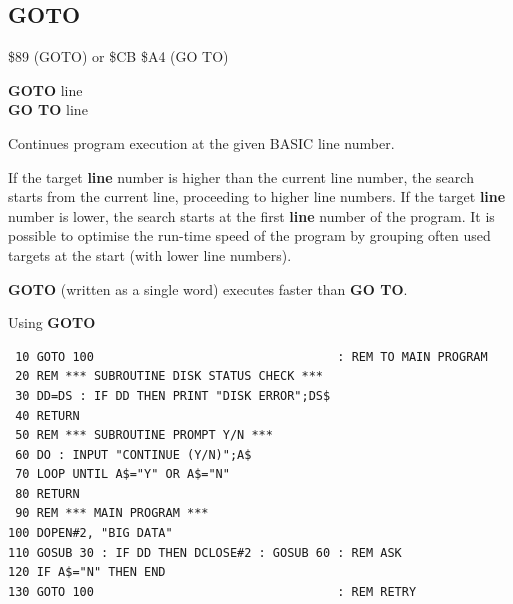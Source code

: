 
\newpage
\subsection{GOTO}
\begin{description}[leftmargin=2cm,style=nextline]
\item [Token:]    \$89 (GOTO) or \$CB \$A4 (GO TO)

\item [Format:]   {\bf GOTO} line \\
                  {\bf GO TO} line

\item [Usage:]    Continues program execution at the given BASIC line number.

\item [Remarks:]  If the target {\bf line} number is higher than the current line number, the search starts from the current line, proceeding to higher line numbers. If the target {\bf line} number is lower, the search starts at the first {\bf line} number of the program. It is possible to optimise the run-time speed of the program by grouping often used targets at the start (with lower line numbers).

                  {\bf GOTO} (written as a single word) executes faster than {\bf GO TO}.

\item [Example:]  Using {\bf GOTO}

\begin{tcolorbox}[colback=black,coltext=white]
\verbatimfont{\codefont}
\begin{verbatim}
 10 GOTO 100                                  : REM TO MAIN PROGRAM
 20 REM *** SUBROUTINE DISK STATUS CHECK ***
 30 DD=DS : IF DD THEN PRINT "DISK ERROR";DS$
 40 RETURN
 50 REM *** SUBROUTINE PROMPT Y/N ***
 60 DO : INPUT "CONTINUE (Y/N)";A$
 70 LOOP UNTIL A$="Y" OR A$="N"
 80 RETURN
 90 REM *** MAIN PROGRAM ***
100 DOPEN#2, "BIG DATA"
110 GOSUB 30 : IF DD THEN DCLOSE#2 : GOSUB 60 : REM ASK
120 IF A$="N" THEN END
130 GOTO 100                                  : REM RETRY
\end{verbatim}
\end{tcolorbox}
\end{description}


\newpage
